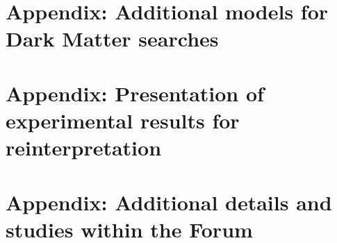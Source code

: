 \documentclass[a4paper,debug,notitlepage,nobib]{tufte-book}
\begin{document}
\appendix

%

\chapter{Appendix: Additional models for Dark Matter searches}
\label{app:EWSpecificModels_Appendix}


\chapter{Appendix: Presentation of experimental results for reinterpretation}
\label{app:Presentation_Of_Experimental_Results}


\chapter{Appendix: Additional details and studies within the Forum}
\label{app:Additional_details}


% 

%

\end{document}
